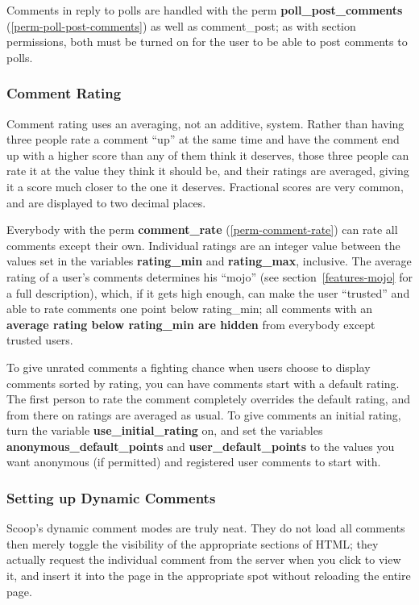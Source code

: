 Comments in reply to polls are handled with the perm {\bf poll\_post\_comments} (\ref{perm-poll-post-comments}) as well as comment\_post; as with section permissions, both must be turned on for the user to be able to post comments to polls.

\subsubsection{Comment Rating}
\label{comments-rate}

Comment rating uses an averaging, not an additive, system.  Rather than having three people rate a comment ``up'' at the same time and have the comment end up with a higher score than any of them think it deserves, those three people can rate it at the value they think it should be, and their ratings are averaged, giving it a score much closer to the one it deserves.  Fractional scores are very common, and are displayed to two decimal places.

Everybody with the perm {\bf comment\_rate} (\ref{perm-comment-rate}) can rate all comments except their own.  Individual ratings are an integer value between the values set in the variables {\bf rating\_min} and {\bf rating\_max}, inclusive.  The average rating of a user's comments determines his ``mojo'' (see section~\ref{features-mojo} for a full description), which, if it gets high enough, can make the user ``trusted'' and able to rate comments one point below rating\_min; all comments with an {\bf average rating below rating\_min are hidden} from everybody except trusted users.

To give unrated comments a fighting chance when users choose to display comments sorted by rating, you can have comments start with a default rating.  The first person to rate the comment completely overrides the default rating, and from there on ratings are averaged as usual.  To give comments an initial rating, turn the variable {\bf use\_initial\_rating} on, and set the variables {\bf anonymous\_default\_points} and {\bf user\_default\_points} to the values you want anonymous (if permitted) and registered user comments to start with.

\subsubsection{Setting up Dynamic Comments}
\label{comments-dynamic}

Scoop's dynamic comment modes are truly neat.  They do not load all comments then merely toggle the visibility of the appropriate sections of HTML; they actually request the individual comment from the server when you click to view it, and insert it into the page in the appropriate spot without reloading the entire page.

